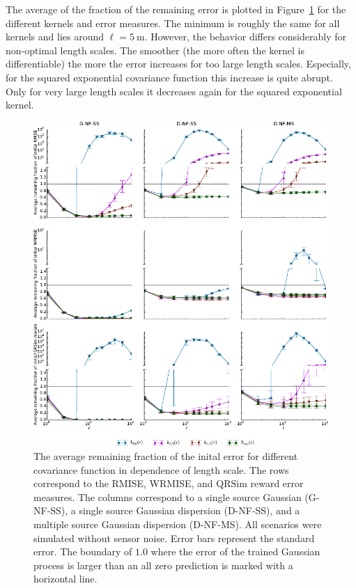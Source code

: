 The average of the fraction of the remaining error is plotted in 
Figure~\ref{fig:lengthscales} for the different kernels and error measures. The 
minimum is roughly the same for all kernels and lies around $\ell 
= \SI{5}{\meter}$.  However, the behavior differs considerably for non-optimal 
length scales.  The smoother (the more often the kernel is differentiable) the 
more the error increases for too large length scales.  Especially, for the 
squared exponential covariance function this increase is quite abrupt. Only for 
very large length scales it decreases again for the squared exponential kernel.

\begin{figure}
    \centering
    \includegraphics{plots/lengthscales}
    \caption[Influence of the length scale of the covariance functions]{The 
        average remaining fraction of the inital error for different covariance 
        function in dependence of length scale.  The rows correspond to the 
        RMISE, WRMISE, and QRSim reward error measures.  The columns correspond 
        to a single source Gaussian (G-NF-SS), a single source Gaussian 
        dispersion (D-NF-SS), and a multiple source Gaussian dispersion 
        (D-NF-MS). All scenarios were simulated without sensor noise.  Error 
        bars represent the standard error. The boundary of $1.0$ where the error 
        of the trained Gaussian process is larger than an all zero prediction is 
        marked with a horizontal line.}\label{fig:lengthscales}
\end{figure}

